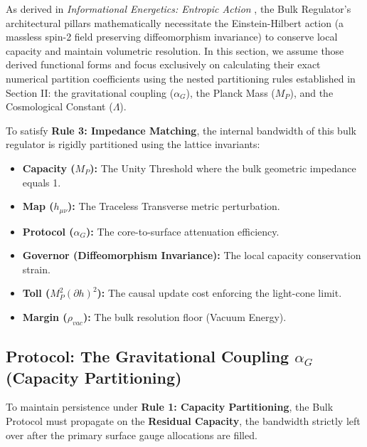 As derived in \textit{Informational Energetics: Entropic Action} \cite{meyer_ieaction_2026}, the Bulk Regulator's architectural pillars mathematically necessitate the Einstein-Hilbert action (a massless spin-2 field preserving diffeomorphism invariance) to conserve local capacity and maintain volumetric resolution. In this section, we assume those derived functional forms and focus exclusively on calculating their exact numerical partition coefficients using the nested partitioning rules established in Section II: the gravitational coupling ($\alpha_G$), the Planck Mass ($M_P$), and the Cosmological Constant ($\Lambda$).

To satisfy \textbf{Rule 3: Impedance Matching}, the internal bandwidth of this bulk regulator is rigidly partitioned using the lattice invariants:

\begin{itemize}
    \item \textbf{Capacity ($M_P$):} The Unity Threshold where the bulk geometric impedance equals 1.
    \item \textbf{Map ($h_{\mu\nu}$):} The Traceless Transverse metric perturbation.
    \item \textbf{Protocol ($\alpha_G$):} The core-to-surface attenuation efficiency.
    \item \textbf{Governor (Diffeomorphism Invariance):} The local capacity conservation strain.
    \item \textbf{Toll ($M_P^2 (\partial h)^2$):} The causal update cost enforcing the light-cone limit.
    \item \textbf{Margin ($\rho_{vac}$):} The bulk resolution floor (Vacuum Energy).
\end{itemize}

\subsection{Protocol: The Gravitational Coupling \texorpdfstring{$\alpha_G$}{alphaG} (Capacity Partitioning)}
To maintain persistence under \textbf{Rule 1: Capacity Partitioning}, the Bulk Protocol must propagate on the \textbf{Residual Capacity}, the bandwidth strictly left over after the primary surface gauge allocations are filled.

